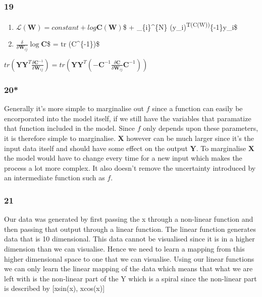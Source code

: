 \documentclass[11pt]{article}
\begin{document}
    \subsubsection{19}\label{section}

\begin{enumerate}
\def\labelenumi{\alph{enumi})}
\item
  \(\mathcal{L}(\pmb W) = constant + log\)\textbar{}\(\pmb C(\pmb W)\)\textbar{}\$
  + \sum\_\{i\}\^{}\{N\}
  (y\_i)\textsuperscript{T(\pmb C(\pmb W))}\{-1\}y\_i\$
\item
  \(\frac{\delta}{\delta\pmb W_{ij}}\log\)\textbar{}\(\pmb C\)\textbar{}\$
  = tr (\pmb C\^{}\{-1\})\$
\end{enumerate}

\(tr ( \pmb Y\pmb Y^T \frac{\delta\pmb C^{-1}}{\delta\pmb W_{ij}}) = tr ( \pmb Y\pmb Y^T (-\pmb C^{-1} \frac{\delta\pmb C}{\delta\pmb W_{ij}}\pmb C^{-1}))\)

    \subsubsection{20*}\label{section}

Generally it's more simple to marginalise out \(f\) since a function can
easily be encorporated into the model itself, if we still have the
variables that paramatize that function included in the model. Since
\(f\) only depends upon these parameters, it is therefore simple to
marginalise. \(\boldsymbol{X}\) however can be much larger since it's
the input data itself and should have some effect on the output
\(\boldsymbol{Y}\). To marginalise \(\boldsymbol{X}\) the model would
have to change every time for a new input which makes the process a lot
more complex. It also doesn't remove the uncertainty introduced by an
intermediate function such as \(f\).

    \subsubsection{21}\label{section}

Our data was generated by first passing the x through a non-linear
function and then passing that output through a linear function. The
linear function generates data that is 10 dimensional. This data cannot
be visualised since it is in a higher dimension than we can visualise.
Hence we need to learn a mapping from this higher dimensional space to
one that we can visualise. Using our linear functions we can only learn
the linear mapping of the data which means that what we are left with is
the non-linear part of the Y which is a spiral since the non-linear part
is described by {[}xsin(x), xcos(x){]}
\end{document}
